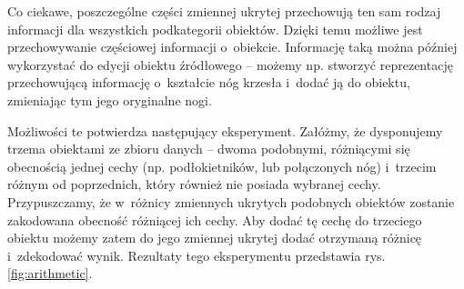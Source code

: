 \documentclass{iithesis}
\begin{document}
Co ciekawe, poszczególne części zmiennej ukrytej przechowują ten sam rodzaj informacji
dla wszystkich podkategorii obiektów. Dzięki temu możliwe jest przechowywanie
częściowej informacji o~obiekcie. Informację taką można później wykorzystać
do edycji obiektu źródłowego -- możemy np. stworzyć reprezentację przechowującą
informację o~kształcie nóg krzesła i~dodać ją do obiektu, zmieniając tym jego oryginalne nogi.

Możliwości te potwierdza następujący eksperyment.
Załóżmy, że dysponujemy trzema obiektami ze zbioru danych -- dwoma podobnymi,
różniącymi się obecnością jednej cechy (np. podłokietników, lub połączonych nóg) i~trzecim
różnym od poprzednich, który również nie posiada wybranej cechy.
Przypuszczamy, że w~różnicy zmiennych ukrytych podobnych obiektów zostanie zakodowana obecność
różniącej ich cechy. Aby dodać tę cechę do trzeciego obiektu możemy zatem do jego zmiennej ukrytej
dodać otrzymaną różnicę i~zdekodować wynik. Rezultaty tego eksperymentu
przedstawia rys. \ref{fig:arithmetic}.

\end{document}
